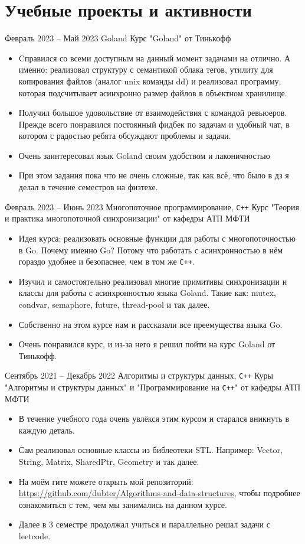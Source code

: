 \section*{Учебные проекты и активности}

\experience
{Февраль 2023 -- Май 2023}
{Goland}
{Курс "Goland" от Тинькофф}
{\begin{itemize}
    \item Cправился со всеми доступным на данный момент задачами на отлично. А именно: реализовал структуру с семантикой облака тегов, утилиту для копирования файлов (аналог unix команды dd) и реализовал программу, которая подсчитывает асинхронно размер файлов в объектном хранилище.
    \item Получил большое удовольствие от взаимодействия с командой ревьюеров. Прежде всего понравился постоянный фидбек по задачам и удобный чат, в котором с радостью ребята обсуждают проблемы и задачи.
    \item Очень заинтересовал язык Goland своим удобством и лаконичностью
    \item При этом задания пока что не очень сложные, так как всё, что было в дз я делал в течение семестров на физтехе. 
\end{itemize}}

\experience
{Февраль 2023 -- Июнь 2023}
{Многопоточное программирование, \texttt{C++}}
{Курс "Теория и практика многопоточной синхронизации" от кафедры АТП МФТИ}
{\begin{itemize}
    \item Идея курса: реализовать основные функции для работы с многопоточностью в Go. Почему именно Go? Потому что работать с асинхронностью в нём гораздо удобнее и безопаснее, чем в том же \texttt{C++}.
    \item Изучил и самостоятельно реализовал многие примитивы синхронизации и классы для работы с асинхронностью языка Goland. Такие как: mutex, condvar, semaphore, future, thread-pool и так далее.
    \item Собственно на этом курсе нам и рассказали все преемущества языка Go.
    \item Очень понравился курс, и из-за него я решил пойти на курс Goland от Тинькофф. 
\end{itemize}}

\experience
{Сентябрь 2021 -- Декабрь 2022}
{Алгоритмы и структуры данных, \texttt{C++}}
{Куры "Алгоритмы и структуры данных" и "Программирование на \texttt{C++}" от кафедры АТП МФТИ}
{\begin{itemize}
    \item  В течение учебного года очень увлёкся этим курсом и старался вникнуть в каждую деталь.
    \item Сам реализовал основные классы из библеотеки STL. Например: Vector, String, Matrix, SharedPtr, Geometry и так далее.
    \item На моём гите можете открыть мой репозиторий: \url{https://github.com/dubter/Algorithms-and-data-structures}, чтобы подробнее ознакомиться с тем, чем мы занимались на данном курсе.
    \item Далее в 3 семестре продолжал учиться и параллельно решал задачи с leetcode.

\end{itemize}}

